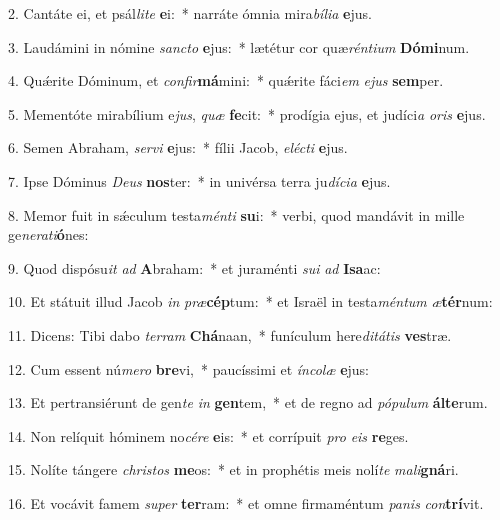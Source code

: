 2. Cantáte ei, et psál\textit{li}\textit{te} \textbf{e}i:~*  narráte ómnia mira\textit{bí}\textit{li}\textit{a} \textbf{e}jus.\

3. Laudámini in nómine \textit{sanc}\textit{to} \textbf{e}jus:~*  lætétur cor quæ\textit{rén}\textit{ti}\textit{um} \textbf{Dó}\textbf{mi}num.\

4. Quǽrite Dóminum, et \textit{con}\textit{fir}\textbf{má}mini:~*  quǽrite fáci\textit{em} \textit{e}\textit{jus} \textbf{sem}per.\

5. Mementóte mirabílium e\textit{jus}, \textit{quæ} \textbf{fe}cit:~*  prodígia ejus, et judíci\textit{a} \textit{o}\textit{ris} \textbf{e}jus.\

6. Semen Abraham, \textit{ser}\textit{vi} \textbf{e}jus:~*  fílii Jacob, \textit{e}\textit{léc}\textit{ti} \textbf{e}jus.\

7. Ipse Dóminus \textit{De}\textit{us} \textbf{nos}ter:~*  in univérsa terra ju\textit{dí}\textit{ci}\textit{a} \textbf{e}jus.\

8. Memor fuit in sǽculum testa\textit{mén}\textit{ti} \textbf{su}i:~*  verbi, quod mandávit in mille ge\textit{ne}\textit{ra}\textit{ti}\textbf{ó}nes:\

9. Quod dispósu\textit{it} \textit{ad} \textbf{A}braham:~*  et juraménti \textit{su}\textit{i} \textit{ad} \textbf{I}\textbf{sa}ac:\

10. Et státuit illud Jacob \textit{in} \textit{præ}\textbf{cép}tum:~*  et Israël in testa\textit{mén}\textit{tum} \textit{æ}\textbf{tér}num:\

11. Dicens: Tibi dabo \textit{ter}\textit{ram} \textbf{Chá}naan,~*  funículum here\textit{di}\textit{tá}\textit{tis} \textbf{ves}træ.\

12. Cum essent nú\textit{me}\textit{ro} \textbf{bre}vi,~*  paucíssimi et \textit{ín}\textit{co}\textit{læ} \textbf{e}jus:\

13. Et pertransiérunt de gen\textit{te} \textit{in} \textbf{gen}tem,~*  et de regno ad \textit{pó}\textit{pu}\textit{lum} \textbf{ál}\textbf{te}rum.\

14. Non relíquit hóminem no\textit{cé}\textit{re} \textbf{e}is:~*  et corrípuit \textit{pro} \textit{e}\textit{is} \textbf{re}ges.\

15. Nolíte tángere \textit{chris}\textit{tos} \textbf{me}os:~*  et in prophétis meis nolí\textit{te} \textit{ma}\textit{li}\textbf{gná}ri.\

16. Et vocávit famem \textit{su}\textit{per} \textbf{ter}ram:~*  et omne firmaméntum \textit{pa}\textit{nis} \textit{con}\textbf{trí}vit.\

